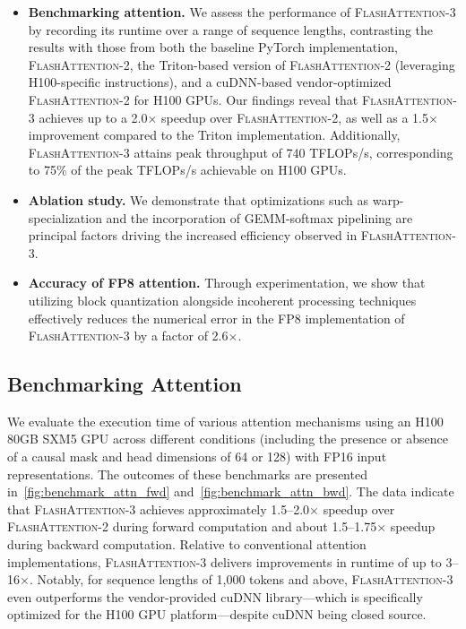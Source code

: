 \begin{algorithm}[H]
\begin{algorithmic}[1]
\begin{enumerate}
\begin{itemize}
\item \textbf{Benchmarking attention.} We assess the performance of \textsc{FlashAttention-3} by recording its runtime over a range of sequence lengths, contrasting the results with those from both the baseline PyTorch implementation, \textsc{FlashAttention-2}, the Triton-based version of \textsc{FlashAttention-2} (leveraging H100-specific instructions), and a cuDNN-based vendor-optimized \textsc{FlashAttention-2} for H100 GPUs. Our findings reveal that \textsc{FlashAttention-3} achieves up to a 2.0$\times$ speedup over \textsc{FlashAttention-2}, as well as a 1.5$\times$ improvement compared to the Triton implementation. Additionally, \textsc{FlashAttention-3} attains peak throughput of 740 TFLOPs/s, corresponding to 75\% of the peak TFLOPs/s achievable on H100 GPUs.
\item \textbf{Ablation study.} We demonstrate that optimizations such as warp-specialization and the incorporation of GEMM-softmax pipelining are principal factors driving the increased efficiency observed in \textsc{FlashAttention-3}.
\item \textbf{Accuracy of FP8 attention.} Through experimentation, we show that utilizing block quantization alongside incoherent processing techniques effectively reduces the numerical error in the FP8 implementation of \textsc{FlashAttention-3} by a factor of 2.6$\times$.
\end{itemize}

\subsection{Benchmarking Attention}
\label{subsec:benchmark_attn}

We evaluate the execution time of various attention mechanisms using an H100 80GB SXM5 GPU across different conditions (including the presence or absence of a causal mask and head dimensions of 64 or 128) with FP16 input representations. The outcomes of these benchmarks are presented in~\cref{fig:benchmark_attn_fwd} and~\cref{fig:benchmark_attn_bwd}. The data indicate that \textsc{FlashAttention-3} achieves approximately 1.5--2.0$\times$ speedup over \textsc{FlashAttention-2} during forward computation and about 1.5--1.75$\times$ speedup during backward computation. Relative to conventional attention implementations, \textsc{FlashAttention-3} delivers improvements in runtime of up to 3--16$\times$. Notably, for sequence lengths of 1,000 tokens and above, \textsc{FlashAttention-3} even outperforms the vendor-provided cuDNN library—which is specifically optimized for the H100 GPU platform—despite cuDNN being closed source.


\end{enumerate}
\end{algorithmic}
\end{algorithm}
